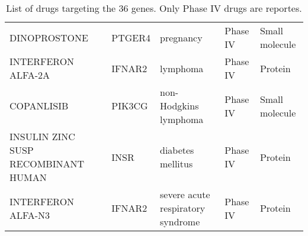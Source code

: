 \documentclass[fleqn,10pt]{SelfArx} %
\begin{document}
\begin{table}[ht]
\begin{tabular}{|lllll|}
		DINOPROSTONE & PTGER4 & pregnancy & Phase IV & Small molecule \\ 
		INTERFERON ALFA-2A & IFNAR2 & lymphoma & Phase IV & Protein \\ 
		COPANLISIB & PIK3CG & non-Hodgkins lymphoma & Phase IV & Small molecule \\ 
		INSULIN ZINC SUSP RECOMBINANT HUMAN & INSR & diabetes mellitus & Phase IV & Protein \\ 
		INTERFERON ALFA-N3 & IFNAR2 & severe acute respiratory syndrome & Phase IV & Protein \\ 
		\hline
	\end{tabular}
	\smallskip
	\caption{List of drugs targeting the 36 genes. Only Phase IV drugs are reportes.}
\end{table}
\end{document}
